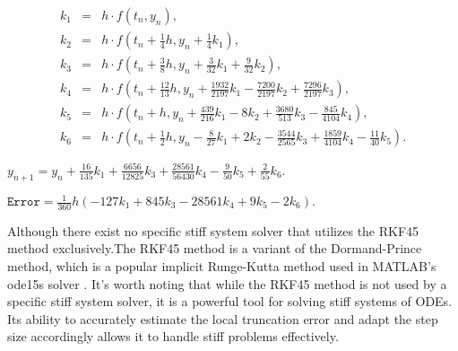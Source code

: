 \documentclass{report}
\begin{document}
\begin{eqnarray*}
  k_1 & = & h \cdot f(t_n, y_n), \\
  k_2 & = & h \cdot f(t_n + \frac{1}{4}h, y_n + \frac{1}{4}k_1), \\
  k_3 & = & h \cdot f(t_n + \frac{3}{8}h, y_n + \frac{3}{32}k_1 + \frac{9}{32}k_2), \\
  k_4 & = & h \cdot f(t_n + \frac{12}{13}h, y_n + \frac{1932}{2197}k_1 - \frac{7200}{2197}k_2 + \frac{7296}{2197}k_3), \\
  k_5 & = & h \cdot f(t_n + h, y_n + \frac{439}{216}k_1 - 8k_2 + \frac{3680}{513}k_3 - \frac{845}{4104}k_4), \\
  k_6 & = & h \cdot f(t_n + \frac{1}{2}h, y_n - \frac{8}{27}k_1 + 2k_2 - \frac{3544}{2565}k_3 + \frac{1859}{4104}k_4 - \frac{11}{40}k_5).
  \end{eqnarray*}
  
  \begin{math}
    y_{n+1} = y_n + \frac{16}{135}k_1 + \frac{6656}{12825}k_3 + \frac{28561}{56430}k_4 - \frac{9}{50}k_5 + \frac{2}{55}k_6.
  \end{math}

\begin{math}
  \mathtt{Error} = \frac{1}{360}h(-127k_1 + 845k_3 - 28561k_4 + 9k_5 - 2k_6).
\end{math}
  
  
Although there exist no specific stiff system solver that utilizes the RKF45 method exclusively.The RKF45 method is a variant of the Dormand-Prince method, which is a popular implicit Runge-Kutta method used in MATLAB's ode15s solver \cite{BurkardtRKF45}.
It's worth noting that while the RKF45 method is not used by a specific stiff system solver, it is a powerful tool for solving stiff systems of ODEs. Its ability to accurately estimate the local truncation error and adapt the step size accordingly allows it to handle stiff problems effectively.\cite{BurkardtRKF45}
  
\end{document}
